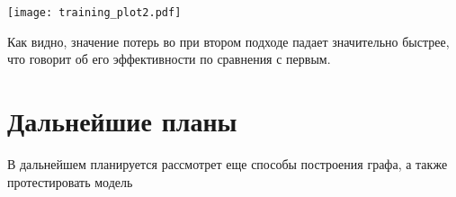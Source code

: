 \documentclass[12pt, twoside]{article}
\begin{document}
\begin{center}
\texttt{[image: training\_plot2.pdf]}
\end{center}

Как видно, значение потерь во при втором подходе падает значительно быстрее, что говорит об его эффективности по сравнения с первым.

\section{Дальнейшие планы}
В дальнейшем планируется рассмотрет еще способы построения графа, а также протестировать модель

\newpage



\end{document}
